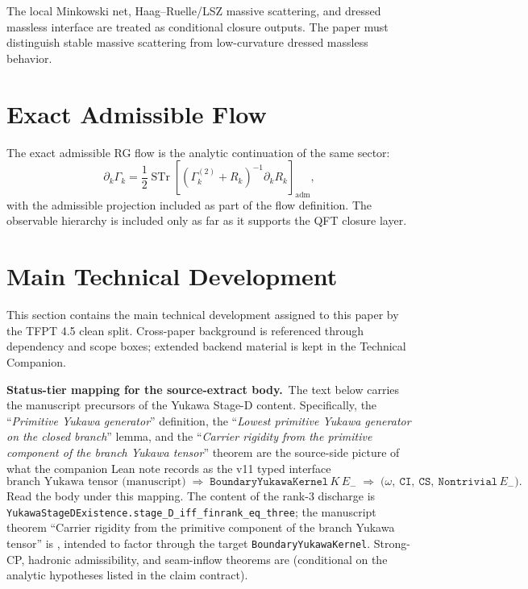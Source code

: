 \documentclass[11pt,a4paper]{article}
\begin{document}
The local Minkowski net, Haag--Ruelle/LSZ massive scattering, and dressed massless interface are
treated as conditional closure outputs. The paper must distinguish stable massive scattering from
low-curvature dressed massless behavior.

\section{Exact Admissible Flow}

The exact admissible RG flow is the analytic continuation of the same sector:
\[
\partial_k\Gamma_k
=
\frac12\operatorname{STr}\left[(\Gamma_k^{(2)}+R_k)^{-1}\partial_kR_k\right]_{\mathrm{adm}},
\]
with the admissible projection included as part of the flow definition. The observable hierarchy is
included only as far as it supports the QFT closure layer.

\clearpage
\section{Main Technical Development}

This section contains the main technical development assigned to this paper by the TFPT 4.5 clean split. Cross-paper background is referenced through dependency and scope boxes; extended backend material is kept in the Technical Companion.

\begin{tfptwarningbox}
\textbf{Status-tier mapping for the source-extract body.}\
The text below carries the manuscript precursors of the
Yukawa Stage-D content. Specifically, the
``\emph{Primitive Yukawa generator}'' definition, the
``\emph{Lowest primitive Yukawa generator on the closed
branch}'' lemma, and the ``\emph{Carrier rigidity from the
primitive component of the branch Yukawa tensor}'' theorem
are the source-side picture of what the companion Lean note
records as the v11 typed interface
\[
\text{branch Yukawa tensor (manuscript)}
\;\Longrightarrow\;
\texttt{BoundaryYukawaKernel}\,K\,E_-
\;\Longrightarrow\;
\bigl(\omega,\ \texttt{CI},\ \texttt{CS},\ \texttt{Nontrivial}\,E_-\bigr).
\]
Read the body under this mapping. The
 content of the rank-3 discharge is
\texttt{YukawaStageDExistence.stage\_D\_iff\_finrank\_eq\_three};
the manuscript theorem ``Carrier rigidity from the primitive
component of the branch Yukawa tensor'' is , intended
to factor through the  target
\texttt{BoundaryYukawaKernel}. Strong-CP, hadronic admissibility,
and seam-inflow theorems are \stag{C} (conditional on the
analytic hypotheses listed in the claim contract).
\end{tfptwarningbox}
\end{document}
